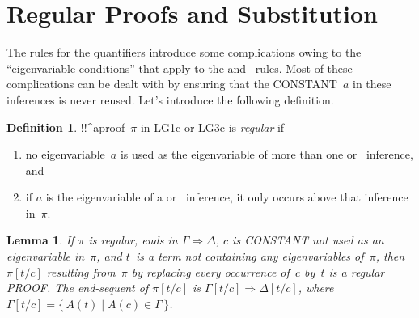 \documentclass[10pt,a4paper]{article}
\newcommand*{\olup}[1]{\MakeUppercase{#1}}
\theoremstyle{plain}
\newtheorem{lem}[thm]{Lemma}
\theoremstyle{definition}
\newtheorem{defn}[thm]{Definition}
\theoremstyle{remark}
\newcommand*{\olfileid}[3]{}
\newcommand*{\olsection}[1]{\section*{#1}}
\newcommand*{\ollabel}[1]{\label{#1}}
\providecommand{\lforall}{\mathord{\forall}}
\providecommand{\lexists}{\mathord{\exists}}
\providecommand{\Sequent}{\mathrel{\Rightarrow}}
\providecommand{\Subst}[3]{#1[#2/#3]}
\providecommand{\Log}{\ensuremath{\mathrm{L}}}
\providecommand{\LeftR}[1]{}
\providecommand{\RightR}[1]{}
\providecommand{\Setabs}[2]{\{\, #1 \mid #2 \,\}}
\providecommand{\RightR}{\mathrm{R}}
\providecommand{\LeftR}{\mathrm{L}}
\begin{document}
\olfileid{pt}{seq}{qua}

\olsection{Regular Proofs and Substitution}

The rules for the quantifiers introduce some complications owing to
the ``eigenvariable conditions'' that apply to the \LeftR{\lexists}
and~\RightR{\lforall} rules. Most of these complications can be dealt
with by ensuring that the \olup{constant}~$a$ in these inferences is
never reused. Let's introduce the following definition.

\begin{defn}
!!^a{proof}~$\pi$ in \Log{G1c} or \Log{G3c} is \emph{regular} if
\begin{enumerate}
  \item no eigenvariable~$a$ is used as the eigenvariable of more than
  one \LeftR{\lexists} or~\RightR{\lforall} inference, and
  \item if $a$ is the eigenvariable of a \LeftR{\lexists}
  or~\RightR{\lforall} inference, it only occurs above that inference
  in~$\pi$.
\end{enumerate}
\end{defn}

\begin{lem}\ollabel{lem:subst-regular} If $\pi$ is regular, ends in
$\Gamma \Sequent \Delta$, $c$ is \olup{constant} not used as an
eigenvariable in~$\pi$, and $t$~is a term not containing any
eigenvariables of~$\pi$, then $\Subst{\pi}{t}{c}$ resulting from~$\pi$
by replacing every occurrence of~$c$ by~$t$ is a regular \olup{proof}.
The end-sequent of $\Subst{\pi}{t}{c}$ is $\Subst{\Gamma}{t}{c}
\Sequent \Subst{\Delta}{t}{c}$, where $\Subst{\Gamma}{t}{c} =
\Setabs{A(t)}{A(c) \in \Gamma}$.
\end{lem}
\end{document}
